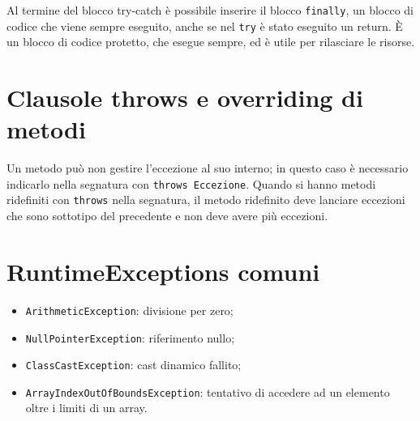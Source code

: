Al termine del blocco try-catch è possibile inserire il blocco \texttt{finally}, un blocco di codice che viene sempre eseguito, anche se nel \texttt{try} è stato eseguito un return. È un blocco di codice protetto, che esegue sempre, ed è utile per rilasciare le risorse.

\section{Clausole throws e overriding di metodi}
Un metodo può non gestire l'eccezione al suo interno; in questo caso è necessario indicarlo nella segnatura con \texttt{throws Eccezione}.
Quando si hanno metodi ridefiniti con \texttt{throws} nella segnatura, il metodo ridefinito deve lanciare eccezioni che sono sottotipo del precedente e non deve avere più eccezioni. 

\section{RuntimeExceptions comuni}
\begin{itemize}
\item \texttt{ArithmeticException}: divisione per zero;
\item \texttt{NullPointerException}: riferimento nullo;
\item \texttt{ClassCastException}: cast dinamico fallito;
\item \texttt{ArrayIndexOutOfBoundsException}: tentativo di accedere ad un elemento oltre i limiti di un array.
\end{itemize}

